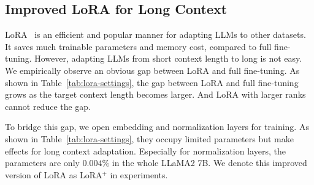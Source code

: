 \documentclass{article} %
\begin{document}
\begin{table}[t]
\begin{center}
\caption{Ablation on fine-tuning and ablations in various settings. Models are trained based on LLaMA2~\citep{llama2} model in 7B size, with the proposed Shift Short Attention. The target context length is 32768.
`+ Normal / Embed' means including normalization or embedding layers as trainable. We use RedPajama~\citep{together2023redpajama} dataset for training. Results are tested in perplexity on PG19~\citep{pg19} validation set. For long context adaptation, standard LoRA~\citep{lora} has a large gap to the full fine-tuning result. Without trainable normalization or embeddings, larger ranks in LoRA have no effects.}
\label{tab:lora-settings}
\end{center}
\end{table}

\subsection{Improved LoRA for Long Context}
LoRA~\citep{lora} is an efficient and popular manner for adapting LLMs to other datasets. It saves much trainable parameters and memory cost, compared to full fine-tuning. However, adapting LLMs from short context length to long is not easy. We empirically observe an obvious gap between LoRA and full fine-tuning. As shown in Table~\ref{tab:lora-settings}, the gap between LoRA and full fine-tuning grows as the target context length becomes larger. And LoRA with larger ranks cannot reduce the gap.


To bridge this gap, we open embedding and normalization layers for training. As shown in Table~\ref{tab:lora-settings}, they occupy limited parameters but make effects for long context adaptation. Especially for normalization layers, the parameters are only $0.004\%$ in the whole LLaMA2 7B. We denote this improved version of LoRA as LoRA$^+$ in experiments.
\end{document}
